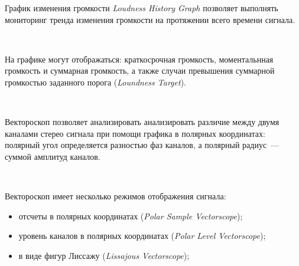 \documentclass{beamer}
\begin{document}
\begin{frame}
График изменения громкости \textit{Loudness History Graph} позволяет выполнять мониторинг тренда изменения громкости на протяжении всего времени сигнала. 

~

На графике могут отображаться: краткосрочная громкость, моментальнная громкость и суммарная громкость, а также случаи превышения суммарной громкостью заданного порога (\textit{Loundness Target}).

~

\end{frame}

\begin{frame}
{Вектороскоп} позволяет анализировать анализировать различие между двумя каналами стерео сигнала при помощи графика в полярных координатах: полярный угол определяется разностью фаз каналов, а полярный радиус~--- суммой амплитуд каналов.  

~

\end{frame}

\begin{frame}
Вектороскоп имеет несколько режимов отображения сигнала:
\begin{itemize}
\item отсчеты в полярных координатах (\textit{Polar Sample Vectorscope});
\item уровень каналов в полярных координатах (\textit{Polar Level Vectorscope});
\item в виде фигур Лиссажу (\textit{Lissajous Vectorscope});
\end{itemize}

\end{frame}
\end{document}
